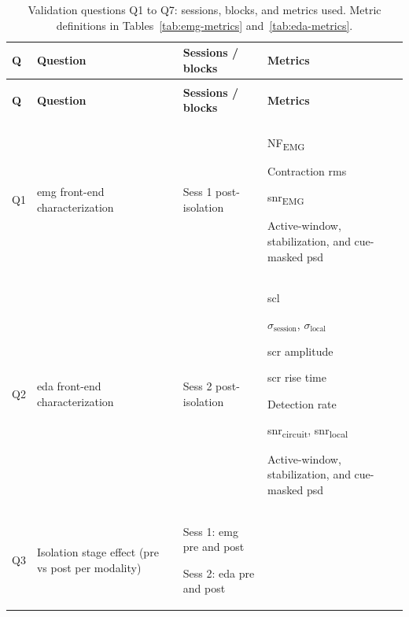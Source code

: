 {\small
\begin{xltabular}{\widetable}{>{\centering\arraybackslash}p{0.5cm} >{\raggedright\arraybackslash}p{2.4cm} >{\raggedright\arraybackslash}p{2.8cm} >{\raggedright\arraybackslash}X}
\caption{Validation questions Q1 to Q7: sessions, blocks, and metrics used. Metric definitions in Tables~\ref{tab:emg-metrics} and~\ref{tab:eda-metrics}.}
\label{tab:validation_overview} \\
\toprule
\textbf{Q} & \textbf{Question} & \textbf{Sessions / blocks} & \textbf{Metrics} \\
\midrule
\endfirsthead
{} \\
\toprule
\textbf{Q} & \textbf{Question} & \textbf{Sessions / blocks} & \textbf{Metrics} \\
\midrule
\endhead
\midrule
{} \\
\endfoot
\bottomrule
\endlastfoot
Q1 & \gls{emg} front-end characterization &
Sess 1 post-isolation &
\begin{tabitemize}
  \item NF\textsubscript{EMG}
  \item Contraction \gls{rms}
  \item \gls{snr}\textsubscript{EMG}
  \item Active-window, stabilization, and cue-masked \gls{psd}
\end{tabitemize} \\
\addlinespace
Q2 & \gls{eda} front-end characterization &
Sess 2 post-isolation &
\begin{tabitemize}
  \item \gls{scl}
  \item $\sigma_\text{session}$, $\sigma_\text{local}$
  \item \gls{scr} amplitude
  \item \gls{scr} rise time
  \item Detection rate
  \item \gls{snr}\textsubscript{circuit}, \gls{snr}\textsubscript{local}
  \item Active-window, stabilization, and cue-masked \gls{psd}
\end{tabitemize} \\
\addlinespace
Q3 & Isolation stage effect (pre vs post per modality) &
\begin{tabitemize}
  \item Sess 1: \gls{emg} pre and post
  \item Sess 2: \gls{eda} pre and post

\end{tabitemize}
\end{xltabular}}
